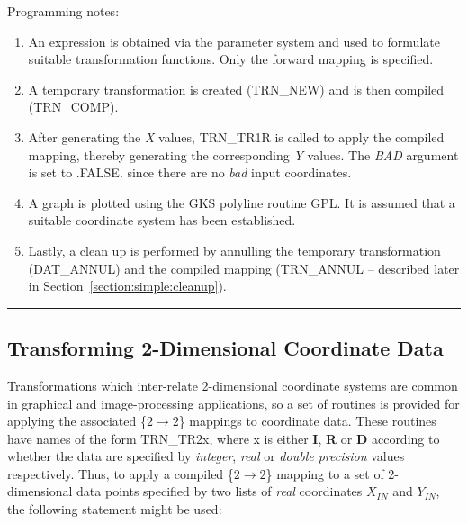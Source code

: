 \documentclass[twoside,11pt]{article}
\newcommand{\xlabel}[1]{}
\newcommand{\name}[1]{\mbox{\small{#1}}}
\newcommand{\fortvar}[1]{\mbox{\emph{#1}}}
\newcommand{\exampledone}[0]{\begin{center} \rule{6em}{0.2mm} \end{center}}
\begin{document}
Programming notes:

\begin{enumerate}

\item An expression is obtained via the parameter system and used to
formulate suitable transformation functions.
Only the forward mapping is specified.

\item A temporary transformation is created (\name{TRN\_NEW}) and is then
compiled (\name{TRN\_COMP}). 

\item After generating the \fortvar{X} values, \name{TRN\_TR1R} is called to
apply the compiled mapping, thereby generating the corresponding \fortvar{Y}
values. 
The \fortvar{BAD} argument is set to \name{.FALSE.} since there are no {\em
bad} input coordinates. 

\item A graph is plotted using the \name{GKS} polyline routine \name{GPL}.
It is assumed that a suitable coordinate system has been established. 

\item Lastly, a clean up is performed by annulling the temporary
transformation (\name{DAT\_ANNUL}) and the compiled mapping
(\name{TRN\_ANNUL} -- described later in
Section~\ref{section:simple:cleanup}). 

\end{enumerate}
\exampledone


\subsection{\xlabel{transforming_2dimensional_coordinate_data}Transforming 2-Dimensional Coordinate Data}

\label{section:simple:2ddata}

Transformations which inter-relate 2-dimensional coordinate systems are
common in graphical and image-processing applications, so a set of routines
is provided for applying the associated \mbox{\{$2 \rightarrow 2$\}}
mappings to coordinate data. 
These routines have names of the form \name{TRN\_TR2x}, where x is either
\textbf{I}, \textbf{R} or \textbf{D} according to whether the data are 
specified by
\emph{integer}, \emph{real} or \emph{double precision} values respectively. 
Thus, to apply a compiled \mbox{\{$2 \rightarrow 2$\}} mapping to a set of
2-dimensional data points specified by two lists of \emph{real} coordinates
$X_{IN}$ and $Y_{IN}$, the following statement might be used: 
\end{document}
